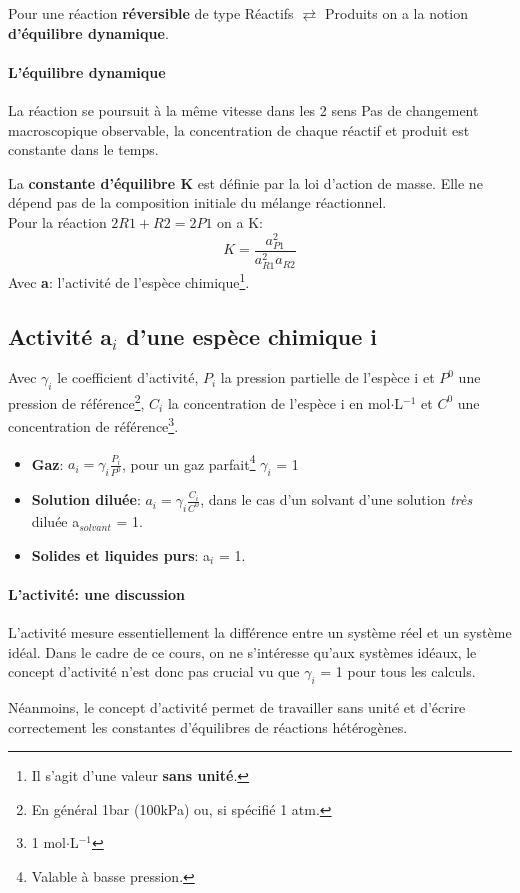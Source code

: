 \documentclass[10pt,a4paper]{book}
\begin{document}
Pour une réaction \textbf{réversible} de type Réactifs $\rightleftarrows$ Produits on a la notion \textbf{d'équilibre dynamique}.
\paragraph{L'équilibre dynamique} La réaction se poursuit à la même vitesse dans les 2 sens
Pas de changement macroscopique observable, la concentration de chaque réactif et produit est constante dans le temps. \par
La \textbf{constante d'équilibre K} est définie par la loi d'action de masse. Elle ne dépend pas de la composition initiale du mélange réactionnel. \\
Pour la réaction \(2R1 + R2 = 2P1\) on a K:
\[K = \frac{a_{P1}^2}{a_{R1}^2 a_{R2}}\]
Avec \textbf{a}: l'activité de l'espèce chimique\footnote{Il s'agit d'une valeur \textbf{sans unité}.}.

\subsection{Activité \texorpdfstring{a$_i$}{ai} d'une espèce chimique i}

Avec \textbf{$\gamma_i$} le coefficient d'activité, $P_i$ la pression partielle de l'espèce i et $P^0$ une pression de référence\footnote{En général 1bar (100kPa) ou, si spécifié 1 atm.}, $C_i$ la concentration de l'espèce i en mol$\cdot$L$^{-1}$ et $C^0$ une concentration de référence\footnote{1 mol$\cdot$L$^{-1}$}.
\begin{itemize}
\item \textbf{Gaz}: \(a_i = \gamma_i\frac{P_i}{P^0}\), pour un gaz parfait\footnote{Valable à basse pression.} $\gamma_i$ = 1
\item \textbf{Solution diluée}: \(a_i = \gamma_i\frac{C_i}{C^0}\), dans le cas d'un solvant d'une solution \textit{très} diluée a$_{solvant}$ = 1.
\item \textbf{Solides et liquides purs}: a$_i$ = 1.
\end{itemize}
\paragraph{L'activité: une discussion} L'activité mesure essentiellement la différence entre un système réel et un système idéal. Dans le cadre de ce cours, on ne s'intéresse qu'aux systèmes idéaux, le concept d'activité n'est donc pas crucial vu que $\gamma_i$ = 1 pour tous les calculs. \par
Néanmoins, le concept d'activité permet de travailler sans unité et d'écrire correctement les constantes d'équilibres de réactions hétérogènes.
\end{document}
